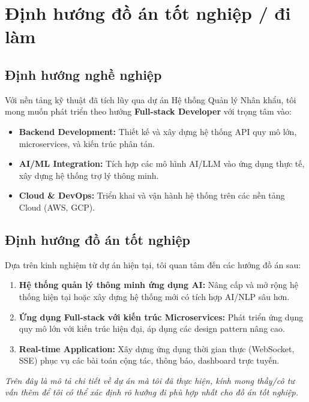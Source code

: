 \documentclass[12pt,a4paper]{article}
\begin{document}
\section{Định hướng đồ án tốt nghiệp / đi làm}

\subsection{Định hướng nghề nghiệp}
Với nền tảng kỹ thuật đã tích lũy qua dự án Hệ thống Quản lý Nhân khẩu, tôi mong muốn phát triển theo hướng \textbf{Full-stack Developer} với trọng tâm vào:
\begin{itemize}
    \item \textbf{Backend Development:} Thiết kế và xây dựng hệ thống API quy mô lớn, microservices, và kiến trúc phân tán.
    \item \textbf{AI/ML Integration:} Tích hợp các mô hình AI/LLM vào ứng dụng thực tế, xây dựng hệ thống trợ lý thông minh.
    \item \textbf{Cloud \& DevOps:} Triển khai và vận hành hệ thống trên các nền tảng Cloud (AWS, GCP).
\end{itemize}

\subsection{Định hướng đồ án tốt nghiệp}
Dựa trên kinh nghiệm từ dự án hiện tại, tôi quan tâm đến các hướng đồ án sau:
\begin{enumerate}
    \item \textbf{Hệ thống quản lý thông minh ứng dụng AI:} Nâng cấp và mở rộng hệ thống hiện tại hoặc xây dựng hệ thống mới có tích hợp AI/NLP sâu hơn.
    \item \textbf{Ứng dụng Full-stack với kiến trúc Microservices:} Phát triển ứng dụng quy mô lớn với kiến trúc hiện đại, áp dụng các design pattern nâng cao.
    \item \textbf{Real-time Application:} Xây dựng ứng dụng thời gian thực (WebSocket, SSE) phục vụ các bài toán cộng tác, thông báo, dashboard trực tuyến.
\end{enumerate}

\vspace{0.5cm}
\noindent \textit{Trên đây là mô tả chi tiết về dự án mà tôi đã thực hiện, kính mong thầy/cô tư vấn thêm để tôi có thể xác định rõ hướng đi phù hợp nhất cho đồ án tốt nghiệp.}
\end{document}
